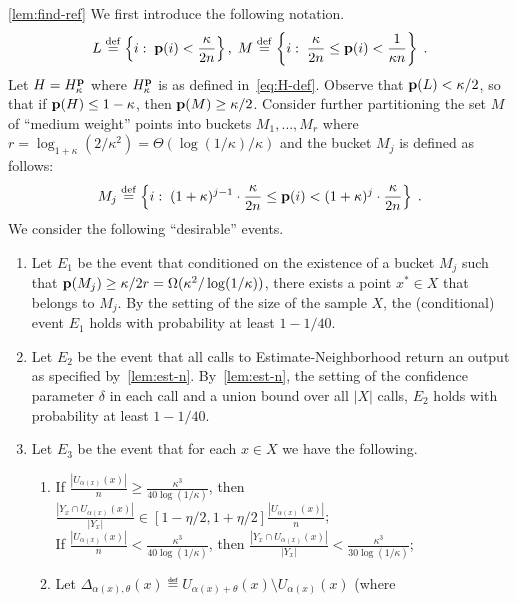 \begin{proofof}{\cref{lem:find-ref}}
We first introduce the following notation.
\begin{equation}
L \stackrel{\rm def}{=} \left\{i :\; \mathbf{p}(i) < \frac{\kappa}{2n}\right\},\;
M \stackrel{\rm def}{=} \left\{i:\; \frac{\kappa}{2 n}
           \leq \mathbf{p}(i) < \frac{1}{\kappa n}\right\}\;.
\end{equation}
Let $H=H^{\mathbf{p}}_\kappa$ where $H^{\mathbf{p}}_\kappa$
is as defined in~\cref{eq:H-def}.
Observe that $\mathbf{p}(L) < \kappa/2$, so that if $\mathbf{p}(H) \leq 1-\kappa$,
then $\mathbf{p}(M) \geq \kappa/2$.
Consider further partitioning the set $M$ of ``medium weight'' points
into buckets $M_1,\dots,M_r$ where
$r = \log_{1+\kappa}(2/\kappa^2) = \Theta(\log(1/\kappa)/\kappa)$
and the bucket $M_j$ is defined as follows:
\begin{equation}
M_j \stackrel{\rm def}{=} \left\{i:\; (1+\kappa)^{j-1}\cdot \frac{\kappa}{2n}
     \leq \mathbf{p}(i) < (1+\kappa)^j \cdot \frac{\kappa}{2 n} \right\}\;.
\end{equation}
We consider the following ``desirable'' events.
\begin{enumerate}
\item Let $E_1$ be the event that conditioned on the existence of
a bucket $M_j$ such that
$\mathbf{p}(M_j) \geq \kappa/2r = \Omega(\kappa^2/\log(1/\kappa))$, there
exists a point $x^\ast \in X$ that belongs to $M_j$. By the setting
of the size of the sample $X$, the (conditional) event $E_1$ holds
with probability at least $1-1/40$.
\item Let $E_2$ be the event that all calls to {\sc Estimate-Neighborhood}
return an output as specified by~\cref{lem:est-n}.
By~\cref{lem:est-n},
the setting of the confidence parameter
$\delta$ in each call and a union bound over all $|X|$
calls, $E_2$ holds with probability at least $1-1/40$.
\item Let $E_3$ be the event that for each $x\in X$
we have the following.
  \begin{enumerate}
   \item If $\frac{|U_{\alpha(x)}(x)|}{n}\geq
       \frac{\kappa^3}{40\log(1/\kappa)}$,
   then
   $\frac{|Y_x\cap U_{\alpha(x)}(x)|}{|Y_x|}
     \in [1-\eta/2,1+\eta/2]\frac{|U_{\alpha(x)}(x)|}{n}$; \\
   If $\frac{|U_{\alpha(x)}(x)|}{n}< \frac{\kappa^3}{40\log(1/\kappa)}$,
   then $\frac{|Y_x\cap U_{\alpha(x)}(x)|}{|Y_x|}
        < \frac{\kappa^3}{30\log(1/\kappa)}$;
    \item Let
  $\Delta_{\alpha(x),\theta}(x) \eqdef
     U_{\alpha(x)+\theta}(x)\setminus U_{\alpha(x)}(x)$ (where

\end{enumerate}
\end{enumerate}
\end{proofof}
